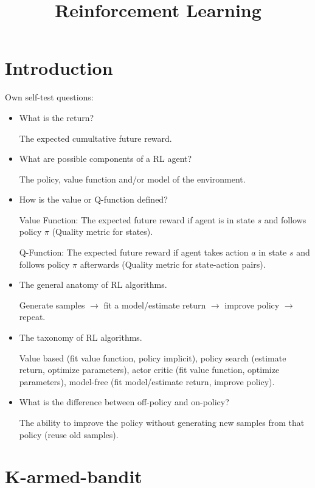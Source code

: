 \documentclass[11pt]{scrartcl}
\title{Reinforcement Learning}
\date{\vspace{-5ex}}
\begin{document}
\maketitle

\section{Introduction}

Own self-test questions:

\begin{itemize}
    \item What is the \glqq{}return\grqq{}?

    The expected cumultative future reward.

    \item What are possible components of a RL agent?

    The policy, value function and/or model of the environment.

    \item How is the value or Q-function defined?

    Value Function: The expected future reward if agent is in state $s$ and follows policy $\pi$ 
    (Quality metric for states).

    Q-Function: The expected future reward if agent takes action $a$ in state $s$ and follows policy $\pi$ 
    afterwards (Quality metric for state-action pairs).

    \item The general anatomy of RL algorithms.

    Generate samples $\rightarrow$ fit a model/estimate return $\rightarrow$ improve policy $\rightarrow$ 
    repeat.

    \item The taxonomy of RL algorithms.

    Value based (fit value function, policy implicit), policy search (estimate return, optimize parameters), 
    actor critic (fit value function, optimize parameters), model-free 
    (fit model/estimate return, improve policy).

    \item What is the difference between off-policy and on-policy?

    The ability to improve the policy without generating new samples from that policy (reuse old samples).
\end{itemize}


\section{K-armed-bandit} 
\end{document}
